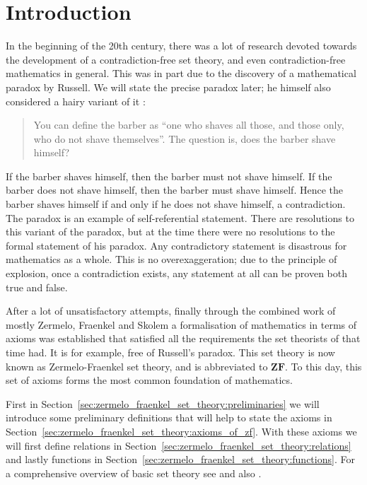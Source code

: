 \documentclass[../main.tex]{subfiles}
\begin{document}
\section*{Introduction}
In the beginning of the 20th century, there was a lot of research devoted towards the development of a contradiction-free set theory, and even contradiction-free mathematics in general. This was in part due to the discovery of a mathematical paradox by Russell. We will state the precise paradox later; he himself also considered a hairy variant of it \cite{Russell2009}:
\begin{quote}
    You can define the barber as “one who shaves all those, and those only, who do not shave themselves”. The question is, does the barber shave himself?
\end{quote}
If the barber shaves himself, then the barber must not shave himself. If the barber does not shave himself, then the barber must shave himself. Hence the barber shaves himself if and only if he does not shave himself, a contradiction. The paradox is an example of self-referential statement. There are resolutions to this variant of the paradox, but at the time there were no resolutions to the formal statement of his paradox. Any contradictory statement is disastrous for mathematics as a whole. This is no overexaggeration; due to the principle of explosion, once a contradiction exists, any statement at all can be proven both true and false.

After a lot of unsatisfactory attempts, finally through the combined work of mostly Zermelo, Fraenkel and Skolem a formalisation of mathematics in terms of axioms was established that satisfied all the requirements the set theorists of that time had. It is for example, free of Russell's paradox. This set theory is now known as Zermelo-Fraenkel set theory, and is abbreviated to $\mathbf{ZF}$. To this day, this set of axioms forms the most common foundation of mathematics.

First in Section~\ref{sec:zermelo_fraenkel_set_theory:preliminaries} we will introduce some preliminary definitions that will help to state the axioms in Section~\ref{sec:zermelo_fraenkel_set_theory:axioms_of_zf}. With these axioms we will first define relations in Section~\ref{sec:zermelo_fraenkel_set_theory:relations} and lastly functions in Section~\ref{sec:zermelo_fraenkel_set_theory:functions}. For a comprehensive overview of basic set theory see \cite{Levy1979} and also \cite{Kunen1992}.
\end{document}
